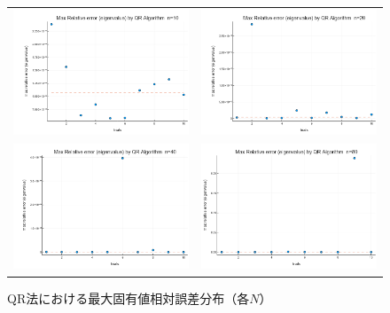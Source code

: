 \documentclass[a4paper,11pt]{ltjsarticle}
\begin{document}
\begin{figure}[H]
  \centering
  \begin{tabular}{cc}
    \includegraphics[width=72mm]{graphs/exp5_n10_max_relerr_eigenvalue.png} &
    \includegraphics[width=72mm]{graphs/exp5_n20_max_relerr_eigenvalue.png} \\
    \includegraphics[width=72mm]{graphs/exp5_n40_max_relerr_eigenvalue.png} &
    \includegraphics[width=72mm]{graphs/exp5_n80_max_relerr_eigenvalue.png} \\
  \end{tabular}
  \caption{QR法における最大固有値相対誤差分布（各$N$）}
  \label{fig:exp5_relerrs}
\end{figure}
\end{document}
